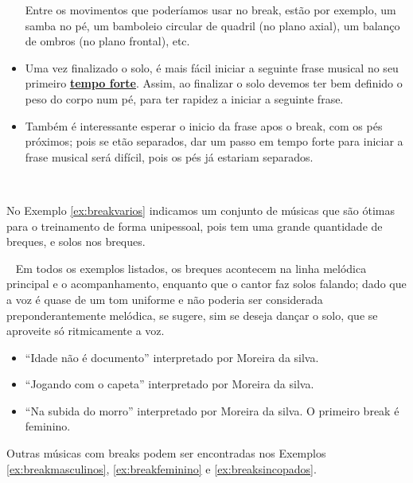 \begin{itemize}
\begin{itemize}
\end{itemize}
Entre os movimentos que poderíamos usar no break, estão por exemplo, 
um samba no pé, um bamboleio circular de quadril (no plano axial), um balanço de ombros (no plano frontal), etc. 
\item Uma vez finalizado o solo, é mais fácil iniciar a seguinte frase musical
no seu primeiro \hyperref[subsec:perceberTF1]{\textbf{tempo forte}}. 
Assim, 
ao finalizar o solo devemos ter bem definido o peso do corpo num pé,
para ter rapidez a iniciar a seguinte frase.
\item Também é interessante esperar o inicio da frase apos o break, 
com os pés próximos; pois se etão separados, 
dar um passo em tempo forte para iniciar a frase musical será difícil,
pois os pés já estariam separados.
\end{itemize}~

No Exemplo \ref{ex:breakvarios} indicamos um conjunto de músicas 
que são ótimas para o treinamento de forma unipessoal,
pois tem uma grande quantidade de breques, 
e solos nos breques.
\begin{example}~
\label{ex:breakvarios}
Em todos os exemplos listados, os breques acontecem na linha melódica principal e o acompanhamento,
enquanto que o cantor faz solos falando; 
dado que a voz é quase de um tom uniforme e não poderia ser considerada preponderantemente melódica,
se sugere, sim se deseja dançar o solo, que se aproveite só ritmicamente a voz.
\begin{itemize}
\item ``Idade não é documento'' interpretado por Moreira da silva.
\item ``Jogando com o capeta'' interpretado por Moreira da silva.
\item ``Na subida do morro'' interpretado por Moreira da silva. 
O primeiro break é feminino.
\end{itemize}
\end{example}

Outras músicas com breaks podem ser encontradas nos Exemplos \ref{ex:breakmasculinos},
\ref{ex:breakfeminino} e 
\ref{ex:breaksincopados}.
